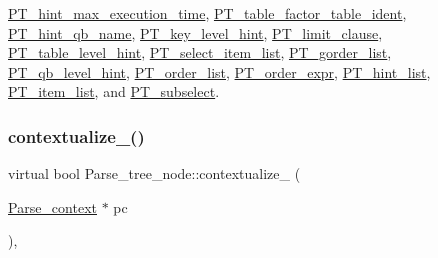 \mbox{\hyperlink{classPT__hint__max__execution__time_a7d073143038eaf1eddc87b1c49f6c5aa}{P\+T\+\_\+hint\+\_\+max\+\_\+execution\+\_\+time}}, \mbox{\hyperlink{classPT__table__factor__table__ident_af45d5e66b0d6c6250f39a82eb526fe70}{P\+T\+\_\+table\+\_\+factor\+\_\+table\+\_\+ident}}, \mbox{\hyperlink{classPT__hint__qb__name_a03c181a0936981540b7f7ce2dd973406}{P\+T\+\_\+hint\+\_\+qb\+\_\+name}}, \mbox{\hyperlink{classPT__key__level__hint_a3cd3bb9624cf499e03d6a312db574fcf}{P\+T\+\_\+key\+\_\+level\+\_\+hint}}, \mbox{\hyperlink{classPT__limit__clause_a90ceb3c85a9f3ae67c5317b30d166b13}{P\+T\+\_\+limit\+\_\+clause}}, \mbox{\hyperlink{classPT__table__level__hint_ab7601fb1f9159525f67e3dcf14c36e9a}{P\+T\+\_\+table\+\_\+level\+\_\+hint}}, \mbox{\hyperlink{classPT__select__item__list_a76b3fc28ad05e3c04a5d6223e8cbeade}{P\+T\+\_\+select\+\_\+item\+\_\+list}}, \mbox{\hyperlink{classPT__gorder__list_aee895e7250e73f670eccd71704b0c027}{P\+T\+\_\+gorder\+\_\+list}}, \mbox{\hyperlink{classPT__qb__level__hint_afb73e765fbf59fa0d2ffbe72d33975be}{P\+T\+\_\+qb\+\_\+level\+\_\+hint}}, \mbox{\hyperlink{classPT__order__list_a04039b92b0e1bd5d37f1975459e7b9b6}{P\+T\+\_\+order\+\_\+list}}, \mbox{\hyperlink{classPT__order__expr_ae99fae42c1559e81262345d5eab0e32e}{P\+T\+\_\+order\+\_\+expr}}, \mbox{\hyperlink{classPT__hint__list_a4579688fbae2297ff9760bb352f57eeb}{P\+T\+\_\+hint\+\_\+list}}, \mbox{\hyperlink{classPT__item__list_a5ddeca0fe325bc50ddcf4bd17da8efa8}{P\+T\+\_\+item\+\_\+list}}, and \mbox{\hyperlink{classPT__subselect_aa6cc38e01fa25d32812f52866724a920}{P\+T\+\_\+subselect}}.

\mbox{\label{classParse__tree__node_ac8f1179a43a65742a342cad21a93aa0e}} 
\subsubsection{\texorpdfstring{contextualize\+\_\+()}{contextualize\_()}}
{\footnotesize\ttfamily virtual bool Parse\+\_\+tree\+\_\+node\+::contextualize\+\_\+ (\begin{DoxyParamCaption}\item[{\mbox{\hyperlink{structParse__context}{Parse\+\_\+context}} $\ast$}]{pc }\end{DoxyParamCaption})\hspace{0.3cm}{\ttfamily [inline]}, {\ttfamily [virtual]}}

